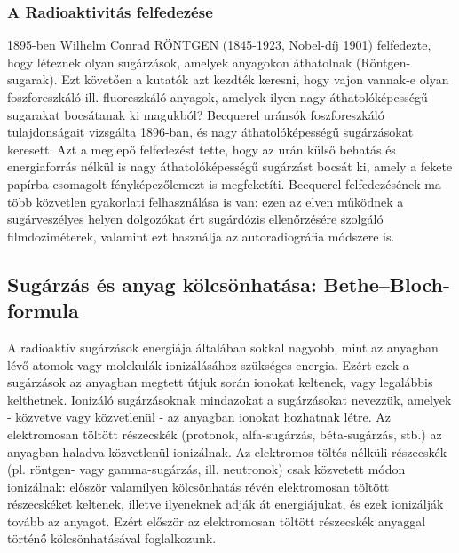 \documentclass[../main.tex]{subfiles}
\begin{document}
\subsubsection*{A Radioaktivitás felfedezése}
1895-ben Wilhelm Conrad RÖNTGEN (1845-1923, Nobel-díj 1901) felfedezte, hogy
léteznek olyan sugárzások, amelyek anyagokon áthatolnak (Röntgen-sugarak). Ezt követően a kutatók azt kezdték keresni, hogy vajon vannak-e olyan foszforeszkáló ill. fluoreszkáló anyagok, amelyek ilyen nagy áthatolóképességű sugarakat bocsátanak ki magukból?
Becquerel uránsók foszforeszkáló tulajdonságait vizsgálta 1896-ban, és nagy áthatolóképességű sugárzásokat keresett. Azt a meglepő felfedezést tette, hogy az urán külső
behatás és energiaforrás nélkül is nagy áthatolóképességű sugárzást bocsát ki, amely a
fekete papírba csomagolt fényképezőlemezt is megfeketíti. Becquerel felfedezésének ma
több közvetlen gyakorlati felhasználása is van: ezen az elven működnek a sugárveszélyes helyen dolgozókat ért sugárdózis ellenőrzésére szolgáló filmdoziméterek, valamint
ezt használja az autoradiográfia módszere is.

\subsection{Sugárzás és anyag kölcsönhatása: Bethe–Bloch-formula}
A radioaktív sugárzások energiája általában sokkal nagyobb, mint az anyagban lévő atomok vagy molekulák ionizálásához szükséges energia. Ezért ezek a sugárzások az
anyagban megtett útjuk során ionokat keltenek, vagy legalábbis kelthetnek. Ionizáló sugárzásoknak mindazokat a sugárzásokat nevezzük, amelyek - közvetve vagy közvetlenül
- az anyagban ionokat hozhatnak létre. Az elektromosan töltött részecskék (protonok,
alfa-sugárzás, béta-sugárzás, stb.) az anyagban haladva közvetlenül ionizálnak. Az elektromos töltés nélküli részecskék (pl. röntgen- vagy gamma-sugárzás, ill. neutronok) csak
közvetett módon ionizálnak: először valamilyen kölcsönhatás révén elektromosan töltött
részecskéket keltenek, illetve ilyeneknek adják át energiájukat, és ezek ionizálják tovább
az anyagot. Ezért először az elektromosan töltött részecskék anyaggal történő kölcsönhatásával foglalkozunk.
\end{document}
